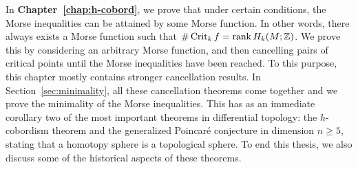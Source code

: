 \bigskip
In \textbf{Chapter~\ref{chap:h-cobord}}, we prove that under certain conditions, the Morse inequalities can be attained by some Morse function.
In other words, there always exists a Morse function such that $\# \operatorname{Crit}_k f = \operatorname{rank} H_k(M; \mathbb{Z})$.
We prove this by considering an arbitrary Morse function,
and then cancelling pairs of critical points until the Morse inequalities have been reached.
To this purpose, this chapter mostly contains stronger cancellation results.
In Section~\ref{sec:minimality}, all these cancellation theorems come together and we prove the minimality of the Morse inequalities.
This has as an immediate corollary two of the most important theorems in differential topology: the $h$-cobordism theorem and the generalized Poincaré conjecture in dimension $n \ge 5$, stating that a homotopy sphere is a topological sphere.
To end this thesis, we also discuss some of the historical aspects of these theorems.
